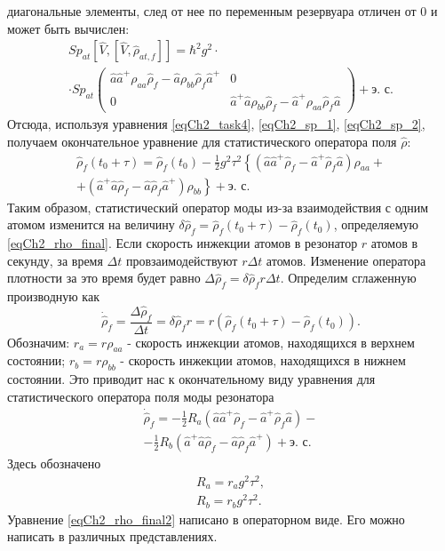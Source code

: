 диагональные элементы, след от нее по переменным резервуара отличен от 
0  и может быть вычислен: 
\begin{eqnarray}
Sp_{at}\left[\hat{V},\left[\hat{V}, \hat{\rho}_{at, f}\right] \right]
= \hbar^2 g^2 \cdot
\nonumber \\
\cdot Sp_{at}
\left(
\begin{array} {cc}
\hat{a} \hat{a}^{+}\rho_{aa} \hat{\rho}_{f} -
\hat{a}\rho_{bb} \hat{\rho}_{f}\hat{a}^{+}  & 0
\\
0 & 
\hat{a}^{+} \hat{a}\rho_{bb} \hat{\rho}_{f} -
\hat{a}^{+}\rho_{aa} \hat{\rho}_{f}\hat{a} 
\end{array}
\right) + \mbox{э. с.} 
\label{eqCh2_sp_2}
\end{eqnarray}
Отсюда, используя уравнения \eqref{eqCh2_task4},
\eqref{eqCh2_sp_1}, \eqref{eqCh2_sp_2}, получаем окончательное
уравнение для статистического оператора поля  $\hat{\rho}$:  
\begin{eqnarray}
\hat{\rho}_{f}\left(t_0 + \tau\right) =
\hat{\rho}_{f}\left(t_0\right) - \frac{1}{2}g^2 \tau^2
\left\{
\left(\hat{a}\hat{a}^{+}\hat{\rho}_{f} - 
\hat{a}^{+}\hat{\rho}_{f}\hat{a}
\right)\rho_{aa} +
\right.
\nonumber \\
\left.
+
\left(\hat{a}^{+}\hat{a}\hat{\rho}_{f} - 
\hat{a}\hat{\rho}_{f}\hat{a}^{+}
\right)\rho_{bb}
\right\} + \mbox{э. с.}
\label{eqCh2_rho_final}
\end{eqnarray}
Таким образом, статистический оператор моды из-за взаимодействия с
одним атомом изменится на величину 
\(
\delta\hat{\rho}_{f}=
\hat{\rho}_{f}\left(t_0 + \tau\right) -
\hat{\rho}_{f}\left(t_0\right)
\), определяемую \eqref{eqCh2_rho_final}. Если скорость инжекции
атомов в резонатор $r$  атомов в секунду, за время  $\Delta t$
провзаимодействуют  $r \Delta t$  атомов. Изменение оператора
плотности за это  время будет равно 
$\Delta \hat{\rho}_{f} = \delta\hat{\rho}_{f}r \Delta t$. Определим сглаженную
производную как 
\[
\dot{\hat{\rho}}_{f} = \frac{\Delta \hat{\rho}_{f}}{\Delta t} = 
\delta\hat{\rho}_{f} r = r 
\left(
\hat{\rho}_{f}\left(t_0 + \tau\right) -
\hat{\rho}_{f}\left(t_0\right)
\right).
\]
Обозначим: $r_a = r \rho_{aa}$ - скорость инжекции атомов, находящихся
в верхнем состоянии; $r_b = r \rho_{bb}$ - скорость инжекции атомов,
находящихся в нижнем состоянии. Это приводит нас к окончательному виду
уравнения для статистического оператора поля моды резонатора 
\begin{eqnarray}
\dot{\hat{\rho}}_{f} =
- \frac{1}{2}R_a
\left(\hat{a}\hat{a}^{+}\hat{\rho}_{f} - 
\hat{a}^{+}\hat{\rho}_{f}\hat{a}
\right)
- 
\nonumber \\
- \frac{1}{2}R_b
\left(\hat{a}^{+}\hat{a}\hat{\rho}_{f} - 
\hat{a}\hat{\rho}_{f}\hat{a}^{+}
\right)
 + \mbox{э. с.}
\label{eqCh2_rho_final2}
\end{eqnarray}
Здесь обозначено 
\begin{eqnarray}
R_a=r_a g^2\tau^2,
\nonumber \\
R_b=r_b g^2\tau^2.
\label{eqCh2_RaRbDefenition}
\end{eqnarray}
Уравнение
\eqref{eqCh2_rho_final2} написано в операторном виде. Его можно
написать в различных представлениях.   
